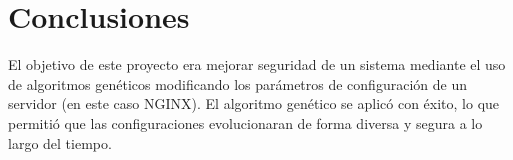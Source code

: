 \chapter{Conclusiones}

El objetivo de este proyecto era mejorar seguridad de un sistema mediante el uso de algoritmos genéticos modificando los parámetros de configuración de un servidor (en este caso NGINX). El algoritmo genético se aplicó con éxito, lo que permitió que las configuraciones evolucionaran de forma diversa y segura a lo largo del tiempo.
